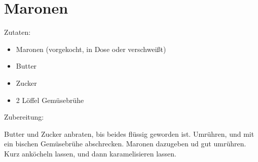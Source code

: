\section{Maronen}
Zutaten:
\begin{itemize}
    \item Maronen (vorgekocht, in Dose oder verschweißt)
    \item Butter
    \item Zucker
    \item 2 Löffel Gemüsebrühe
\end{itemize}

\noindent Zubereitung:

Butter und Zucker anbraten, bis beides flüssig geworden ist. Umrühren, und mit
ein bischen Gemüsebrühe abschrecken. Maronen dazugeben ud gut umrühren. Kurz
anköcheln lassen, und dann karamelisieren lassen.

\noindent
\mbox{}
\vfill
\begin{center}
\end{center}
\vfill
\mbox{ }
\newpage
